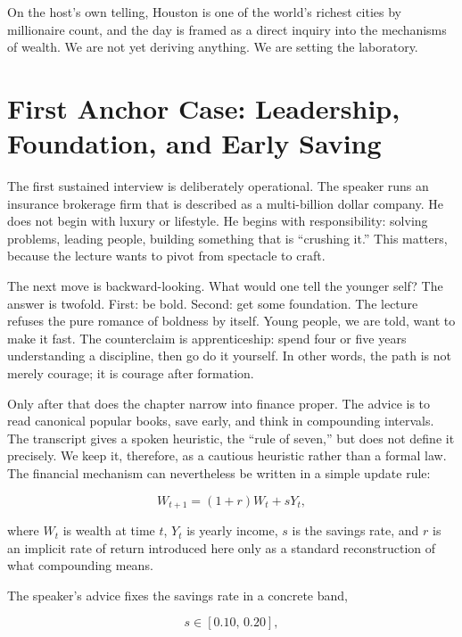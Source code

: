 On the host's own telling, Houston is one of the world's richest cities by millionaire count, and the day is framed as a direct inquiry into the mechanisms of wealth. We are not yet deriving anything. We are setting the laboratory.

\section{First Anchor Case: Leadership, Foundation, and Early Saving}

The first sustained interview is deliberately operational. The speaker runs an insurance brokerage firm that is described as a multi-billion dollar company. He does not begin with luxury or lifestyle. He begins with responsibility: solving problems, leading people, building something that is ``crushing it.'' This matters, because the lecture wants to pivot from spectacle to craft.

The next move is backward-looking. What would one tell the younger self? The answer is twofold. First: be bold. Second: get some foundation. The lecture refuses the pure romance of boldness by itself. Young people, we are told, want to make it fast. The counterclaim is apprenticeship: spend four or five years understanding a discipline, then go do it yourself. In other words, the path is not merely courage; it is courage after formation.

Only after that does the chapter narrow into finance proper. The advice is to read canonical popular books, save early, and think in compounding intervals. The transcript gives a spoken heuristic, the ``rule of seven,'' but does not define it precisely. We keep it, therefore, as a cautious heuristic rather than a formal law. The financial mechanism can nevertheless be written in a simple update rule:

\begin{equation}
W_{t+1} = (1+r)W_t + sY_t,
\end{equation}

where \(W_t\) is wealth at time \(t\), \(Y_t\) is yearly income, \(s\) is the savings rate, and \(r\) is an implicit rate of return introduced here only as a standard reconstruction of what compounding means.

The speaker's advice fixes the savings rate in a concrete band,

\begin{equation}
s \in [0.10,\,0.20],
\end{equation}

